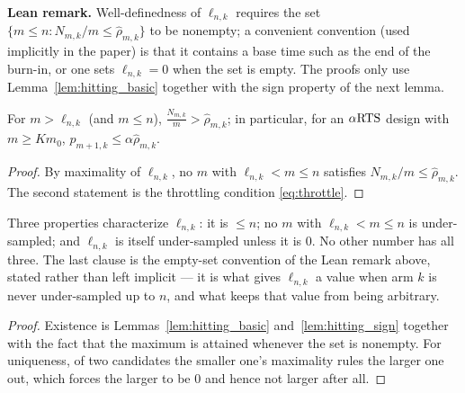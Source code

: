 \textbf{Lean remark.} Well-definedness of $\ell_{n,k}$ requires the set
$\{m\le n : N_{m,k}/m \le \hat\rho_{m,k}\}$ to be nonempty; a convenient
convention (used implicitly in the paper) is that it contains a base time such
as the end of the burn-in, or one sets $\ell_{n,k}=0$ when the set is empty.
The proofs only use Lemma~\ref{lem:hitting_basic} together with the sign
property of the next lemma.

\begin{lemma}\label{lem:hitting_sign}
\leanok
{}
For $m > \ell_{n,k}$ (and $m \le n$), $\frac{N_{m,k}}{m} > \hat{\rho}_{m,k}$;
in particular, for an $\alpha\text{RTS}$ design with $m \ge Km_0$, $p_{m+1,k} \le \alpha\hat{\rho}_{m,k}$.
\end{lemma}

\begin{proof}\leanok
By maximality of $\ell_{n,k}$, no $m$ with $\ell_{n,k} < m \le n$ satisfies
$N_{m,k}/m \le \hat{\rho}_{m,k}$. The second statement is the throttling
condition \eqref{eq:throttle}.
\end{proof}

\begin{lemma}\label{lem:hitting_unique}
\leanok
{}
Three properties characterize $\ell_{n,k}$: it is $\le n$; no $m$ with $\ell_{n,k}<m\le n$ is
under-sampled; and $\ell_{n,k}$ is itself under-sampled unless it is $0$. No other number has all
three. The last clause is the empty-set convention of the Lean remark above, stated rather than
left implicit — it is what gives $\ell_{n,k}$ a value when arm $k$ is never under-sampled up to
$n$, and what keeps that value from being arbitrary.
\end{lemma}

\begin{proof}\leanok
{}
Existence is Lemmas~\ref{lem:hitting_basic} and~\ref{lem:hitting_sign} together with the fact that
the maximum is attained whenever the set is nonempty. For uniqueness, of two candidates the smaller
one's maximality rules the larger one out, which forces the larger to be $0$ and hence not larger
after all.
\end{proof}
